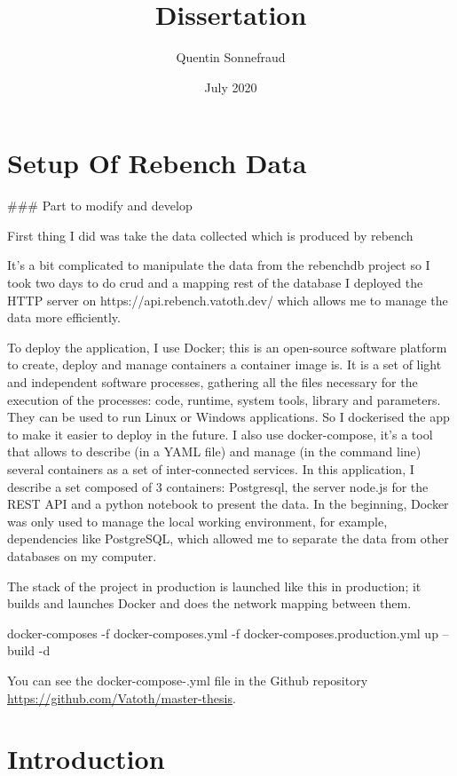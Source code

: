 \documentclass{article}
\title{Dissertation}
\author{Quentin Sonnefraud}
\date{July 2020}
\begin{document}
\maketitle

\tableofcontents

\section{Setup Of Rebench Data}

\#\#\# Part to modify and develop

First thing I did was take the data collected  which is produced by rebench \cite{ReBench:2018}

It's a bit complicated to manipulate the data from the rebenchdb project so I took two days to do crud and a mapping rest of the database I deployed the HTTP server on https://api.rebench.vatoth.dev/ which allows me to manage the data more efficiently.

To deploy the application, I use Docker; this is an open-source software platform to create, deploy and manage containers a container image is. It is a set of light and independent software processes, gathering all the files necessary for the execution of the processes: code, runtime, system tools, library and parameters. They can be used to run Linux or Windows applications. So I dockerised the app to make it easier to deploy in the future. I also use docker-compose, it's a tool that allows to describe (in a YAML file) and manage (in the command line) several containers as a set of inter-connected services. In this application, I describe a set composed of 3 containers: Postgresql, the server node.js for the REST API and a python notebook to present the data. In the beginning, Docker was only used to manage the local working environment, for example, dependencies like PostgreSQL, which allowed me to separate the data from other databases on my computer.

The stack of the project in production is launched like this in production; it builds and launches Docker and does the network mapping between them.

docker-composes -f docker-composes.yml -f docker-composes.production.yml up --build -d

You can see the docker-compose-.yml file in the Github repository \url{https://github.com/Vatoth/master-thesis}. 



\section{Introduction}
\end{document}

